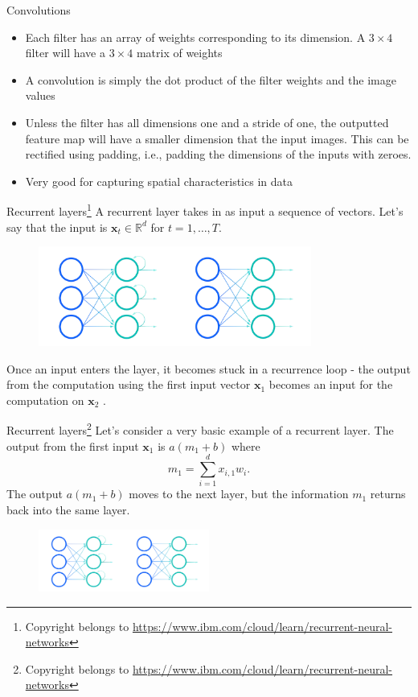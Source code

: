 \documentclass{beamer}
\begin{document}
\begin{frame}{Convolutions}
\begin{itemize}
\item Each filter has an array of weights corresponding to its dimension. A $3\times 4$ filter will have a $3\times 4$ matrix of weights
\item A convolution is simply the dot product of the filter weights and the image values
\item Unless the filter has all dimensions one and a stride of one, the outputted feature map will have a smaller dimension that the input images. This can be rectified using padding, i.e., padding the dimensions of the inputs with zeroes. 
\item Very good for capturing spatial characteristics in data
\end{itemize}
\end{frame}
\begin{frame}{Recurrent layers\footnote{Copyright belongs to \url{https://www.ibm.com/cloud/learn/recurrent-neural-networks}}}
A recurrent layer takes in as input a sequence of vectors. Let's say that the input is $\mathbf{x}_t\in\mathbb{R}^d$ for $t=1,\dots,T$.

\begin{figure}
\centering
\includegraphics[width=0.8\textwidth]{Images/rnn.png}
\end{figure}
Once an input enters the layer, it becomes stuck in a recurrence loop - the output from the computation using the first input vector $\mathbf{x}_1$ becomes an input for the computation on $\mathbf{x}_2$ .
\end{frame}
\begin{frame}{Recurrent layers\footnote{Copyright belongs to \url{https://www.ibm.com/cloud/learn/recurrent-neural-networks}}}
Let's consider a very basic example of a recurrent layer. The output from the first input $\mathbf{x}_1$ is $a(m_1+b)$ where
\[
m_1=\sum^d_{i=1}x_{i,1}w_i.
\]
The output $a(m_1+b)$ moves to the next layer, but the information $m_1$ returns back into the same layer.
\begin{figure}
\centering
\includegraphics[width=0.5\textwidth]{Images/rnn.png}
\end{figure}
\end{frame}
\end{document}
